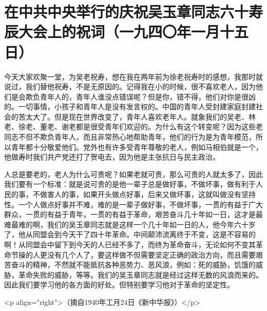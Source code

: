 \section[在中共中央举行的庆祝吴玉章同志六十寿辰大会上的祝词（一九四〇年一月十五日）]{在中共中央举行的庆祝吴玉章同志六十寿辰大会上的祝词（一九四〇年一月十五日）}


今天大家欢聚一堂，为吴老祝寿，想在我在两年前为徐老祝寿时的感想，我那时就说过，我们替他祝寿，不是无原因的。记得我在小的时候，很不喜欢老人，因为他们是会欺负青年人的，青年人谁没点错误呢？但是你，错不得，他们对你是很凶的。一切事情，小孩子和青年人是没有发言权的。中国的青年人受封建家庭封建社会的苦太大了。但是现在世界改变了，青年人喜欢老年人。就象我们的吴老、林老、徐老、董老、谢老都是很受青年们欢迎的。为什么有这个转变呢？因为这些老同志不但不欺负青年人，而且非常热心地帮助青年，他们的行为是为青年模范，所以青年都十分敬爱他们。党外也有许多受青年尊敬的老人，例如马相伯就是一个，他做寿时我们共产党还打了贺电去，因为他是主张抗日与民主政治。

人总是要老的，老人为什么可贵呢？如果老就可贵，那么可贵的人就太多了，因此我们要有一个标准：就是说可贵的是他一辈子总是做好事，不做坏事，做有利于人民的事，不做害人的事，如果开头做点好事，后来又做坏事，这就叫做没有坚持性。一个人做点好事并不难，难的是一辈子做好事，不做坏事，一贯的有益于广大群众，一贯的有益于青年，一贯的有益于革命，艰苦奋斗几十年如一日，这才是最难最难的啊，我们的吴玉章同志就是这样一个几十年如一日的人，他今年六十岁了，他从同盟会到今天干了四十年革命。中间颠沛流离终于不变，这是不容易的啊！从同盟会中留下到今天的人已经不多了，而终为革命奋斗，无论如何不变其革命节操的人更没有几个人了，要这样做不但需要坚定正确的政治方向，而且需要艰苦奋斗的精神，不然就不能抵抗各种恶势力、恶风浪，例如：死的威胁，饥饿的威胁，革命失败的威胁，等等。我们的吴玉章同志就是经过这样无数的风浪而来的。因此我们要学习他的各方面的好处。但特别要学习他对于革命的坚定性。

<p align="right">（摘自1940年工月24日《新中华报》）</p>

